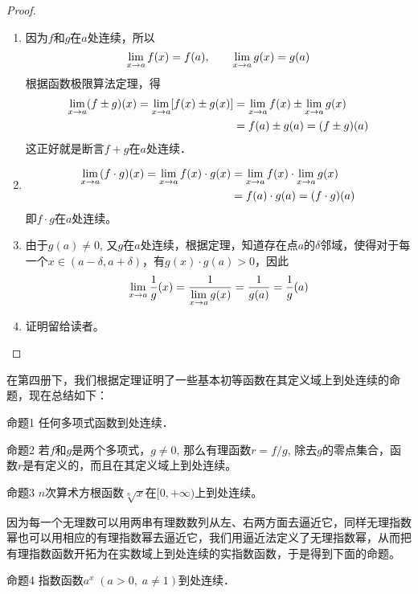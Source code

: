 \begin{proof}
\begin{enumerate}
    \item 因为$f$和$g$在$a$处连续，所以
    \[\displaystyle\lim_{x\to a} f (x) =f (a) ,\qquad  \lim_{x\to a} g (x) =g (a)\]
    根据函数极限算法定理，得
   \[\begin{split}
    \displaystyle\lim_{x\to a} (f\pm g)(x)=\displaystyle\lim_{x\to a}[f(x)\pm g(x)]&=\displaystyle\lim_{x\to a} f(x)\pm \displaystyle\lim_{x\to a}g(x)\\
    &=f(a)\pm g(a)=(f\pm g)(a)
   \end{split} \]
    这正好就是断言$f+g$在$a$处连续．
    \item \[\begin{split}
        \displaystyle\lim_{x\to a} (f\cdot g) (x)=\displaystyle\lim_{x\to a}f(x)\cdot g(x)&=\displaystyle\lim_{x\to a} f(x)\cdot\displaystyle\lim_{x\to a}g (x)\\
        &=f (a) \cdot g (a) =(f\cdot g) (a) 
    \end{split}\]
    即$f\cdot g$在$a$处连续。
    \item 由于$g(a)\ne 0$, 又$g$在$a$处连续，根据定理，知道存在点$a$的$\delta$邻域，使得对于每一个$x\in (a-\delta,a+\delta)$，有$g(x)\cdot g(a)>0$，因此
\[\displaystyle\lim_{x\to a} \dfrac{1}{g}(x)=\dfrac{1}{\displaystyle\lim_{x\to a} g(x)}=\dfrac{1}{g(a)}=\dfrac{1}{g}(a)\]

\item 证明留给读者。
\end{enumerate} 
\end{proof}

在第四册下，我们根据定理证明了一些基本初等函数在其定义域上到处连续的命题，现在总结如下：

\begin{blk}
   {命题1} 任何多项式函数到处连续． 
\end{blk}

\begin{blk}{命题2}
    若$f$和$g$是两个多项式，$g\ne 0$, 那么有理函数$r=f/g$, 除去$g$的零点集合，函数$r$是有定义的，而且在其定义域上到处连续。
\end{blk}

\begin{blk}
   {命题3} $n$次算术方根函数$\sqrt[n]{x}$在$[0,+\infty)$上到处连续。
\end{blk}

因为每一个无理数可以用两串有理数数列从左、右两方面去逼近它，同样无理指数幂也可以用相应的有理指数幂去逼近它，我们用逼近法定义了无理指数幂，从而把有理指数函数开拓为在实数域上到处连续的实指数函数，于是得到下面的命题。 

\begin{blk}
    {命题4} 指数函数$a^x\; (a>0,\; a\ne 1)$到处连续．
\end{blk}

